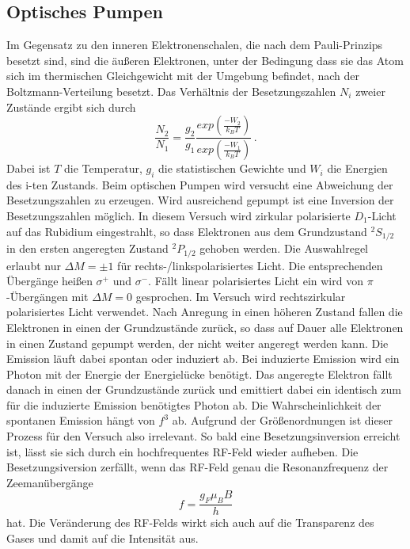 \subsection{Optisches Pumpen}
\label{sec:OptischesPumpen}
Im Gegensatz zu den inneren Elektronenschalen, die nach dem Pauli-Prinzips besetzt sind, sind die äußeren
Elektronen, unter der Bedingung dass sie das Atom sich im thermischen Gleichgewicht mit der Umgebung
befindet, nach der Boltzmann-Verteilung besetzt. Das Verhältnis der Besetzungszahlen $N_i$ zweier Zustände
ergibt sich durch
\begin{equation}
    \label{eq:Besetzung}
    \frac{N_2}{N_1} = \frac{g_2}{g_1}\frac{exp(\frac{-W_2}{k_B T})}{exp(\frac{-W_1}{k_B T})}\,.
\end{equation}
Dabei ist $T$ die Temperatur, $g_i$ die statistischen Gewichte und $W_i$ die Energien des i-ten Zustands.
Beim optischen Pumpen wird versucht eine Abweichung der Besetzungszahlen zu erzeugen. Wird ausreichend gepumpt
ist eine Inversion der Besetzungszahlen möglich. In diesem Versuch wird zirkular polarisierte $D_1$-Licht
auf das Rubidium eingestrahlt, so dass Elektronen aus dem Grundzustand $^2S_{1/2}$ in den ersten angeregten Zustand
$^2P_{1/2}$ gehoben werden. Die Auswahlregel erlaubt nur $\Delta M = \pm1$ für rechts-/linkspolarisiertes Licht.
Die entsprechenden Übergänge heißen $\sigma^+$ und $\sigma^-$. Fällt linear polarisiertes Licht ein wird von
$\pi$-Übergängen mit $\Delta M = 0$ gesprochen. Im Versuch wird rechtszirkular polarisiertes Licht verwendet.
Nach Anregung in einen höheren Zustand fallen die Elektronen in einen der Grundzustände zurück, so dass auf Dauer
alle Elektronen in einen Zustand gepumpt werden, der nicht weiter angeregt werden kann. Die Emission läuft dabei
spontan oder induziert ab. Bei induzierte Emission wird ein Photon mit der Energie der Energielücke benötigt. Das
angeregte Elektron fällt danach in einen der Grundzustände zurück und emittiert dabei ein identisch zum für die
induzierte Emission benötigtes Photon ab. Die Wahrscheinlichkeit der spontanen Emission hängt von $f^3$ ab.
Aufgrund der Größenordnungen ist dieser Prozess für den Versuch also irrelevant. So bald eine Besetzungsinversion
erreicht ist, lässt sie sich durch ein hochfrequentes RF-Feld wieder aufheben. Die Besetzungsiversion zerfällt,
wenn das RF-Feld genau die Resonanzfrequenz der Zeemanübergänge
\begin{equation}
    \label{eq:Resonanz}
    f = \frac{g_F \mu_B B}{h}
\end{equation}
hat. Die Veränderung des RF-Felds wirkt sich auch auf die Transparenz des Gases und damit auf die Intensität aus.
